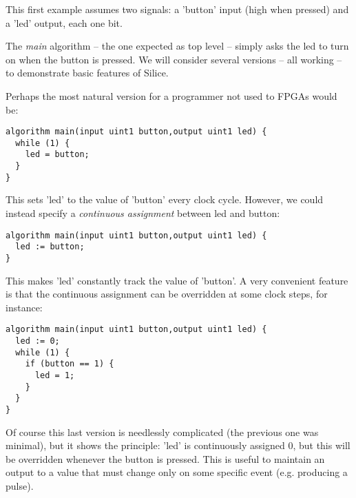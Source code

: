 \documentclass[a4]{article}
\newcommand\silice{Silice}
\begin{document}
This first example assumes two signals: a 'button' input (high when pressed) and a 'led' output, each one bit.

The \textit{main} algorithm -- the one expected as top level -- simply asks the led to turn on when the button is pressed. We will consider several versions -- all working -- to demonstrate basic features of \silice{}.

Perhaps the most natural version for a programmer not used to FPGAs would be:

\begin{verbatim}
algorithm main(input uint1 button,output uint1 led) {  
  while (1) {
    led = button;
  }
}
\end{verbatim}
This sets 'led' to the value of 'button' every clock cycle.
%
However, we could instead specify a \textit{continuous assignment} between led and button:

\begin{verbatim}
algorithm main(input uint1 button,output uint1 led) {  
  led := button;
}
\end{verbatim}

This makes 'led' constantly track the value of 'button'. A very convenient feature is that the continuous assignment can be overridden at some clock steps, for instance:

\begin{verbatim}
algorithm main(input uint1 button,output uint1 led) {  
  led := 0;
  while (1) {
    if (button == 1) {
      led = 1;
    }
  }  
}
\end{verbatim}

Of course this last version is needlessly complicated (the previous one was minimal), but it shows the principle: 'led' is continuously assigned 0, but this will be overridden whenever the button is pressed. This is useful to maintain an output to a value that must change only on some specific event (e.g. producing a pulse).


\tableofcontents

\end{document}
